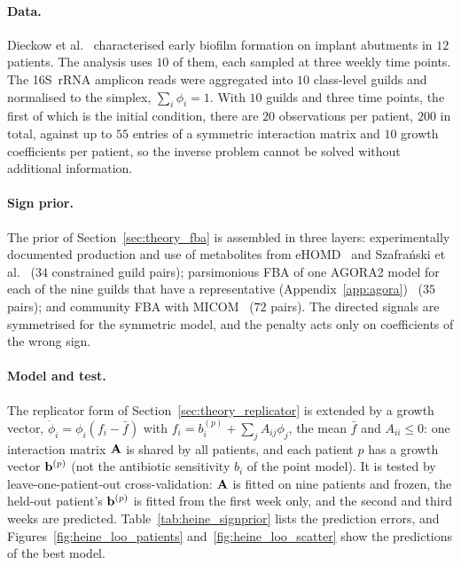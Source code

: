 \paragraph{Data.} Dieckow et al.~\cite{dieckow2024structure} characterised
early biofilm formation on implant abutments in $12$ patients. The analysis
uses $10$ of them, each sampled at three weekly time points. The
16S~rRNA amplicon reads were aggregated into $10$ class-level guilds and
normalised to the simplex, $\sum_i\phi_i=1$. With $10$ guilds and three time
points, the first of which is the initial condition, there are $20$ observations
per patient, $200$ in total, against up to $55$ entries of a symmetric
interaction matrix and $10$ growth coefficients per patient, so the inverse
problem cannot be solved without additional information.

\paragraph{Sign prior.} The prior of Section~\ref{sec:theory_fba} is assembled
in three layers: experimentally documented production and use of metabolites
from eHOMD~\cite{Escapa2018eHOMD} and Szafra\'{n}ski et
al.~\cite{Szafranski2025} ($34$ constrained guild pairs); parsimonious FBA of
one AGORA2 model for each of the nine guilds that have a representative
(Appendix~\ref{app:agora})~\cite{Heinken2023AGORA2} ($35$ pairs); and
community FBA with MICOM~\cite{Diener2020MICOM} ($72$ pairs). The directed
signals are symmetrised for the symmetric model, and the penalty acts only on
coefficients of the wrong sign.

\paragraph{Model and test.} The replicator form of
Section~\ref{sec:theory_replicator} is extended by a growth vector,
$\dot\phi_i=\phi_i(f_i-\bar f)$ with $f_i=b^{(p)}_i+\sum_jA_{ij}\phi_j$,
the mean $\bar f$ and $A_{ii}\le0$: one interaction matrix $\mathbf{A}$ is
shared by all patients, and each patient $p$ has a growth vector $\mathbf{b}^{(p)}$
(not the antibiotic sensitivity $b_i$ of the point model). It is
tested by leave-one-patient-out cross-validation: $\mathbf{A}$ is fitted on nine
patients and frozen, the held-out patient's $\mathbf{b}^{(p)}$ is fitted from the
first week only, and the second and third weeks are predicted.
Table~\ref{tab:heine_signprior} lists the prediction errors, and
Figures~\ref{fig:heine_loo_patients} and~\ref{fig:heine_loo_scatter} show the
predictions of the best model.

